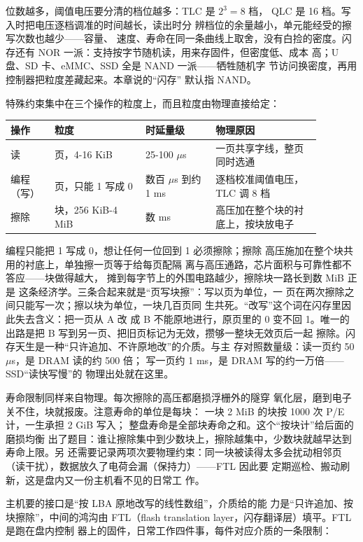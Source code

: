 位数越多，阈值电压要分清的档位越多：TLC 是 $2^{3}=8$ 档，
QLC 是 16 档。写入时把电压逐档调准的时间越长，读出时分
辨档位的余量越小，单元能经受的擦写次数也越少——容量、
速度、寿命在同一条曲线上取舍，没有白捡的密度。闪存还有
NOR 一派：支持按字节随机读，用来存固件，但密度低、成本
高；U 盘、SD 卡、eMMC、SSD 全是 NAND 一派——牺牲随机字
节访问换密度，再用控制器把粒度差藏起来。本章说的“闪存”
默认指 NAND。

特殊约束集中在三个操作的粒度上，而且粒度由物理直接给定：

\begin{longtable}{L{0.12\linewidth}L{0.26\linewidth}L{0.2\linewidth}L{0.3\linewidth}}
\toprule
操作 & 粒度 & 时延量级 & 物理原因 \\
\midrule
读 & 页，4-16 KiB & 25-100 $\mu$s & 一页共享字线，整页同时选通 \\\tablerowrule
编程（写） & 页，只能 1 写成 0 & 数百 $\mu$s 到约 1 ms & 逐档校准阈值电压，TLC 调 8 档 \\\tablerowrule
擦除 & 块，256 KiB-4 MiB & 数 ms & 高压加在整个块的衬底上，按块放电子 \\
\bottomrule
\end{longtable}

编程只能把 1 写成 0，想让任何一位回到 1 必须擦除；擦除
高压施加在整个块共用的衬底上，单独擦一页等于给每页配隔
离与高压通路，芯片面积与可靠性都不答应——块做得越大，
摊到每字节上的外围电路越少，擦除块一路长到数 MiB 正是
这条经济学。三条合起来就是“页写块擦”：写以页为单位，一
页在两次擦除之间只能写一次；擦以块为单位，一块几百页同
生共死。“改写”这个词在闪存里因此失去含义：把一页从 A 改
成 B 不能原地进行，原页里的 0 变不回 1。唯一的出路是把
B 写到另一页、把旧页标记为无效，攒够一整块无效页后一起
擦除。闪存天生是一种“只许追加、不许原地改”的介质。与主
存对照数量级：读一页约 50 $\mu$s，是 DRAM 读的约 500 倍；
写一页约 1 ms，是 DRAM 写的约一万倍——SSD“读快写慢”的
物理出处就在这里。

寿命限制同样来自物理。每次擦除的高压都磨损浮栅外的隧穿
氧化层，磨到电子关不住，块就报废。注意寿命的单位是每块：
一块 2 MiB 的块按 1000 次 P/E 计，一生承担 2 GiB 写入；
整盘寿命是全部块寿命之和。这个“按块计”给后面的磨损均衡
出了题目：谁让擦除集中到少数块上，擦除越集中，少数块就越早达到寿命上限。另
还需要记录两项次要物理约束：同一块被读得太多会扰动相邻页
（读干扰），数据放久了电荷会漏（保持力）——FTL 因此要
定期巡检、搬动刷新，这是盘内又一份主机看不见的日常工
作。

主机要的接口是“按 LBA 原地改写的线性数组”，介质给的能
力是“只许追加、按块擦除”，中间的鸿沟由 FTL（flash
translation layer，闪存翻译层）填平。FTL 是跑在盘内控制
器上的固件，日常工作四件事，每件对应介质的一条限制：

